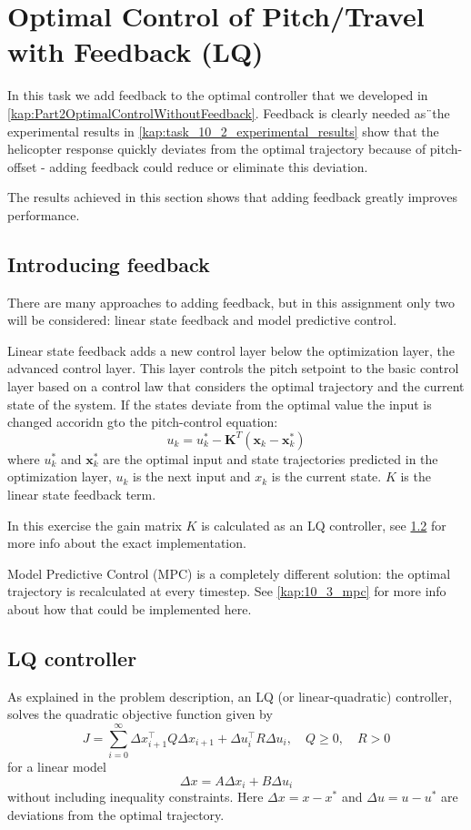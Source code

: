 \documentclass[../main.tex]{subfiles}
\begin{document}
\section{Optimal Control of Pitch/Travel with Feedback (LQ)}
In this task we add feedback to the optimal controller that we developed in \cref{kap:Part2OptimalControlWithoutFeedback}. Feedback is clearly needed as¨the experimental results in \cref{kap:task_10_2_experimental_results} show that the helicopter response quickly deviates from the optimal trajectory because of pitch-offset - adding feedback could reduce or eliminate this deviation.

The results achieved in this section shows that adding feedback greatly improves performance.

\subsection{Introducing feedback}
There are many approaches to adding feedback, but in this assignment only two will be considered: linear state feedback and model predictive control.

Linear state feedback adds a new control layer below the optimization layer, the advanced control layer. This layer controls the pitch setpoint to the basic control layer based on a control law that considers the optimal trajectory and the current state of the system. If the states deviate from the optimal value the input is changed accoridn gto the pitch-control equation:
\begin{equation}\label{eq:lab3_feedback}
	u_k = u_k^* - \bm{K}^T(\bm x_k - \bm x_k^*)
\end{equation}
where $u_k^*$ and $\bm x_k^*$ are the optimal input and state trajectories predicted in the optimization layer, $u_k$ is the next input and $x_k$ is the current state. $K$ is the linear state feedback term. 

In this exercise the gain matrix $K$ is calculated as an LQ controller, see \cref{kap:task_10_3_LQ_controller} for more info about the exact implementation.

Model Predictive Control (MPC) is a completely different solution: the optimal trajectory is recalculated at every timestep. See \cref{kap:10_3_mpc} for more info about how that could be implemented here.

\subsection{LQ controller} \label{kap:task_10_3_LQ_controller}
As explained in the problem description, an LQ (or linear-quadratic) controller, solves the quadratic objective function given by
\begin{equation}
    J = \sum^\infty_{i=0} \Delta x_{i+1}^\top Q \Delta x_{i+1} + \Delta u_i^\top R \Delta u_i, \quad Q \ge0, \quad R > 0
\end{equation}
for a linear model
\begin{equation}\label{eq:lab3_lin_model}
	\Delta x=A\Delta x_i + B \Delta u_i
\end{equation}
without including inequality constraints.
Here $ \Delta x = x - x^*$ and $\Delta u = u - u^*$ are deviations from the optimal trajectory.
\end{document}
